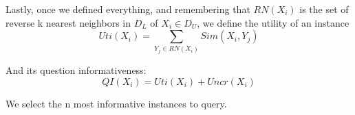 Lastly, once we defined everything, and remembering that $RN(X_i)$ is the set of reverse
k nearest neighbors in $D_L$ of $X_i \in D_U$, we define the utility of an instance
\begin{equation}
    Uti(X_i) = \sum_{Y_j \in RN(X_i)} Sim(X_i, Y_j)
\end{equation}

And its question informativeness:
\begin{equation}
    QI(X_i) = Uti(X_i) + Uncr(X_i)
\end{equation}

We select the n most informative instances to query.




